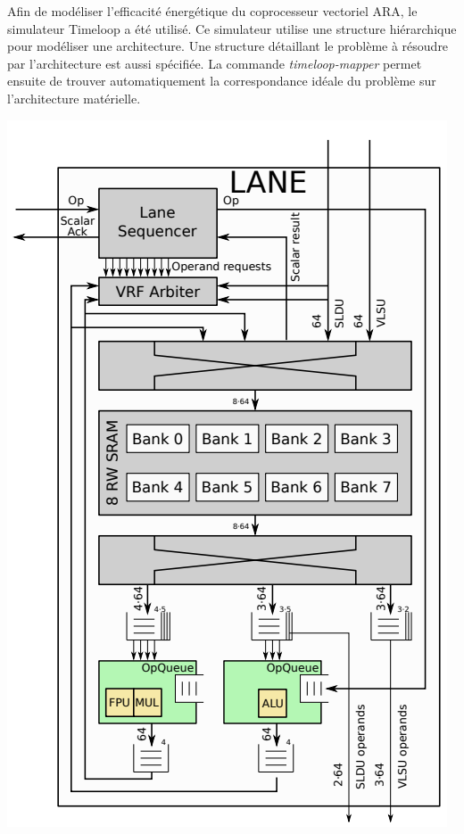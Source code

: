 \documentclass[11pt,letterpaper]{article}
\begin{document}
\begin{multicols}{2}
    Afin de modéliser l'efficacité énergétique du coprocesseur vectoriel ARA, le simulateur Timeloop a été 
    utilisé. Ce simulateur utilise une structure hiérarchique pour modéliser une architecture. Une structure
    détaillant le problème à résoudre par l'architecture est aussi spécifiée. La commande \textit{timeloop-mapper}
    permet ensuite de trouver automatiquement la correspondance idéale du problème sur l'architecture matérielle.

    {\centering
    \includegraphics[width=\linewidth]{lane_arch.png}
    \captionsetup{hypcap=false}
    \label{fig:lane_arch}}
    \bigskip


\end{multicols}
\end{document}
